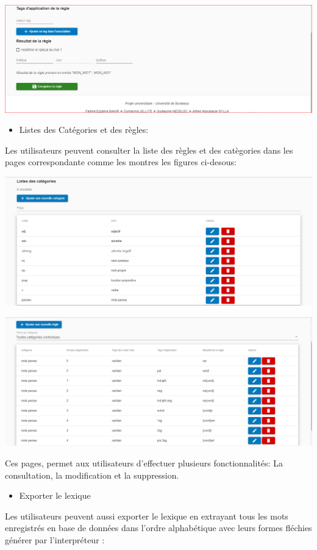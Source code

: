 \documentclass[12pt,a4paper]{article}
\begin{document}
 
 \includegraphics[width=150mm]{img/AjouterReg2.PNG}



\begin{itemize}  
  \item Listes des Catégories et des règles:
\end{itemize}
Les utilisateurs peuvent consulter la liste des règles et des catègories dans les pages correspondante comme les montres les figures ci-desous: 


 \includegraphics[width=150mm]{img/GestionCat.PNG}


 \includegraphics[width=150mm]{img/GestionReg.PNG}


Ces pages, permet aux utilisateurs  d'effectuer plusieurs fonctionnalités: La consultation, la modification et la suppression.




\begin{itemize}  
  \item Exporter le lexique
\end{itemize}
Les utilisateurs peuvent aussi exporter le lexique en extrayant tous les mots enregistrés en base de données dans l'ordre alphabétique avec leurs formes fléchies générer par l'interpréteur :
\end{document}

